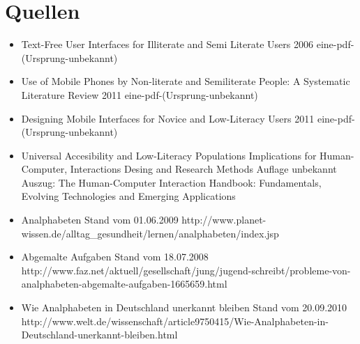 \newpage 


\thispagestyle{empty}


 \section*{Quellen}



\begin{itemize}

  \item {}
					{Text-Free User Interfaces for Illiterate and Semi Literate Users}
					{2006}
					{eine-pdf-(Ursprung-unbekannt)}
	
	\item {}
					{Use of Mobile Phones by Non-literate and Semiliterate People: A Systematic Literature Review}
					{2011}
					{eine-pdf-(Ursprung-unbekannt)}
					
	\item {}
					{Designing Mobile Interfaces for Novice and Low-Literacy Users}
					{2011}
					{eine-pdf-(Ursprung-unbekannt)}

	\item {}
					{Universal Accesibility and Low-Literacy Populations}
					{Implications for Human-Computer, Interactions Desing and Research Methods}
					{Auflage unbekannt}
					{Auszug: The Human-Computer Interaction Handbook: Fundamentals, Evolving Technologies and Emerging Applications}

	\item {}
						{Analphabeten}
						{Stand vom 01.06.2009}
						{http://www.planet-wissen.de/alltag_gesundheit/lernen/analphabeten/index.jsp}
										

	\item {}
						{Abgemalte Aufgaben}
						{Stand vom 18.07.2008}
						{http://www.faz.net/aktuell/gesellschaft/jung/jugend-schreibt/probleme-von-analphabeten-abgemalte-aufgaben-1665659.html}									

	\item {}
						{Wie Analphabeten in Deutschland unerkannt bleiben}
						{Stand vom 20.09.2010}
						{http://www.welt.de/wissenschaft/article9750415/Wie-Analphabeten-in-Deutschland-unerkannt-bleiben.html}	


\end{itemize}
